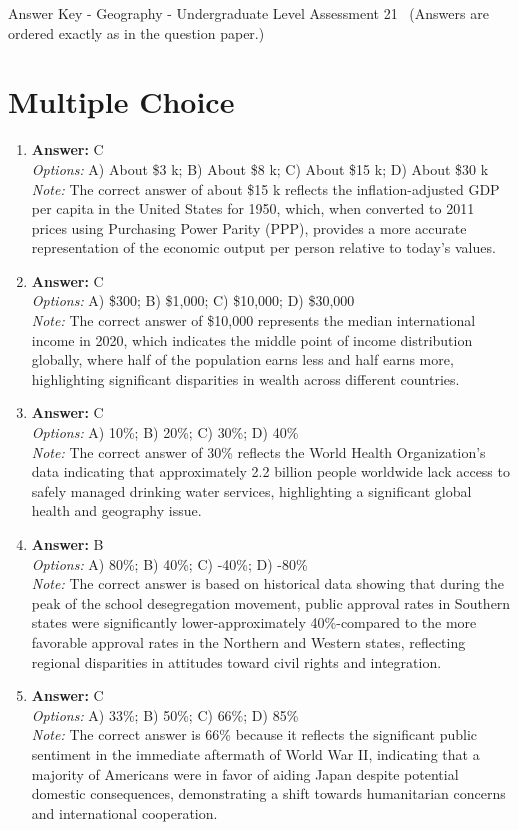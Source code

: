 \documentclass[12pt]{article}
\begin{document}
\begin{center}
Answer Key - Geography - Undergraduate Level Assessment 21 \
\small (Answers are ordered exactly as in the question paper.)
\end{center}

\section*{Multiple Choice}
\begin{enumerate}[label=\arabic*.]
\item \textbf{Answer:} C
\\ \textit{Options:} A) About \$3 k; B) About \$8 k; C) About \$15 k; D) About \$30 k
\\ \textit{Note:} The correct answer of about \$15 k reflects the inflation-adjusted GDP per capita in the United States for 1950, which, when converted to 2011 prices using Purchasing Power Parity (PPP), provides a more accurate representation of the economic output per person relative to today's values.
\item \textbf{Answer:} C
\\ \textit{Options:} A) \$300; B) \$1,000; C) \$10,000; D) \$30,000
\\ \textit{Note:} The correct answer of \$10,000 represents the median international income in 2020, which indicates the middle point of income distribution globally, where half of the population earns less and half earns more, highlighting significant disparities in wealth across different countries.
\item \textbf{Answer:} C
\\ \textit{Options:} A) 10\%; B) 20\%; C) 30\%; D) 40\%
\\ \textit{Note:} The correct answer of 30\% reflects the World Health Organization's data indicating that approximately 2.2 billion people worldwide lack access to safely managed drinking water services, highlighting a significant global health and geography issue.
\item \textbf{Answer:} B
\\ \textit{Options:} A) 80\%; B) 40\%; C) -40\%; D) -80\%
\\ \textit{Note:} The correct answer is based on historical data showing that during the peak of the school desegregation movement, public approval rates in Southern states were significantly lower-approximately 40\%-compared to the more favorable approval rates in the Northern and Western states, reflecting regional disparities in attitudes toward civil rights and integration.
\item \textbf{Answer:} C
\\ \textit{Options:} A) 33\%; B) 50\%; C) 66\%; D) 85\%
\\ \textit{Note:} The correct answer is 66\% because it reflects the significant public sentiment in the immediate aftermath of World War II, indicating that a majority of Americans were in favor of aiding Japan despite potential domestic consequences, demonstrating a shift towards humanitarian concerns and international cooperation.
\end{enumerate}
\end{document}
